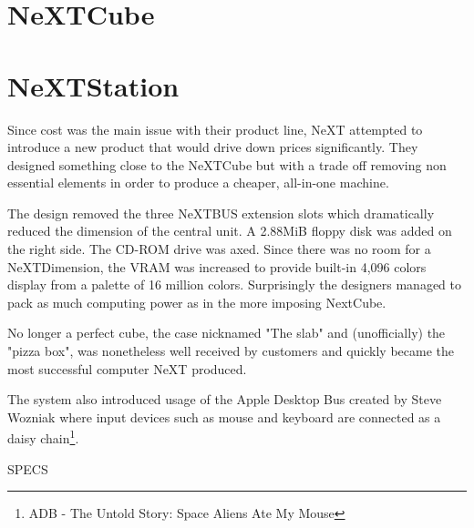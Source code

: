 \section{NeXTCube}

\begin{minipage}{\textwidth}
 
\end{minipage}
\pagebreak







\section{NeXTStation}
Since cost was the main issue with their product line, NeXT attempted to introduce a new product that would drive down prices significantly. They designed something close to the NeXTCube but with a trade off removing non essential elements in order to produce a cheaper, all-in-one machine.\\
\par
 The design removed the three NeXTBUS extension slots which dramatically reduced the dimension of the central unit. A 2.88MiB floppy disk was added on the right side. The CD-ROM drive was axed. Since there was no room for a NeXTDimension, the VRAM was increased to provide built-in 4,096 colors display from a palette of 16 million colors. Surprisingly the designers managed to pack as much computing power as in the more imposing NextCube.\\
\par 
{}
\par
No longer a perfect cube, the case nicknamed "The slab" and (unofficially) the "pizza box", was nonetheless well received by customers and quickly became the most successful computer NeXT produced.\\
\par
The system also introduced usage of the Apple Desktop Bus created by Steve Wozniak where input devices such as mouse and keyboard are connected as a daisy chain\footnote{ADB - The Untold Story: Space Aliens Ate My Mouse}.\\

\par
{}
\par
SPECS
\pagebreak









